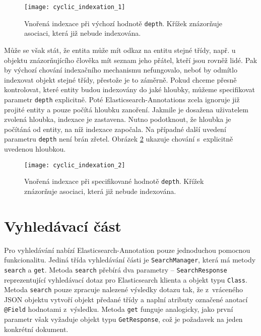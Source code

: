 \documentclass[11pt,oneside]{fithesis2}
\begin{document}
\begin{figure}[htb]
	\begin{center}
		\texttt{[image: cyclic\_indexation\_1]}
	\end{center}
	\caption{Vnořená indexace při výchozí hodnotě \texttt{depth}. Křížek znázorňuje asociaci, která již nebude indexována.}	
	\label{CyclicIndexation1}
\end{figure}

Může se však stát, že entita může mít odkaz na entitu stejné třídy, např. u objektu znázorňujícího člověka mít seznam jeho přátel, kteří jsou rovněž lidé. Pak by výchozí chování indexačního mechanismu nefungovalo, neboť by odmítlo indexovat objekt stejné třídy, přestože je to záměrně. Pokud chceme přesně kontrolovat, které entity budou indexovány do jaké hloubky, můžeme specifikovat parametr \texttt{depth} explicitně. Poté Elasticsearch-Annotations zcela ignoruje již projité entity a pouze počítá hloubku zanoření. Jakmile je dosažena uživatelem zvolená hloubka, indexace je zastavena. Nutno podotknout, že hloubka je počítáná od entity, na níž indexace započala. Na případné další uvedení parametru \texttt{depth}  není brán zřetel. Obrázek \ref{CyclicIndexation2} ukazuje chování s~explicitně uvedenou hloubkou.

\begin{figure}[htb]
	\begin{center}
		\texttt{[image: cyclic\_indexation\_2]}
	\end{center}
	\caption{Vnořená indexace při specifikované hodnotě \texttt{depth}.  Křížek znázorňuje asociaci, která již nebude indexována.}	
	\label{CyclicIndexation2}
\end{figure}

\section{Vyhledávací část}
Pro vyhledávání nabízí Elasticsearch-Annotation pouze jednoduchou pomocnou funkcionalitu. Jediná třída vyhledávání části je \texttt{SearchManager}, která má metody \texttt{search} a \texttt{get}. Metoda \texttt{search} přebírá dva parametry -- \texttt{SearchResponse} reprezentující vyhledávací dotaz pro Elasticsearch klienta a objekt typu \texttt{Class}. Metoda \texttt{search} pouze zpracuje nalezené výsledky dotazu tak, že z~vráceného JSON objektu vytvoří objekt předané třídy a naplní atributy označené anotací \texttt{@Field} hodnotami z~výsledku. Metoda \texttt{get} funguje analogicky, jako první parametr však vyžaduje objekt typu \texttt{GetResponse}, což je požadavek na jeden konkrétní dokument.
\end{document}

